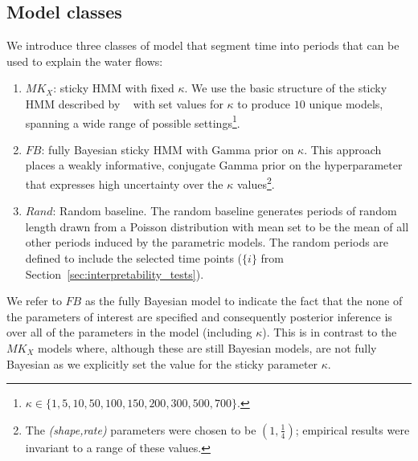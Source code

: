 \documentclass[letterpaper]{article} %
\newcommand{\citename}[1]{\citeauthor{#1}~\shortcite{#1}}
\begin{document}

\subsection{Model classes}
We introduce three classes of model that segment time into periods that can be used to explain the water flows:

\begin{enumerate}
    \item  {${MK_X}$: sticky HMM with fixed $\kappa$.} We use the basic structure of the sticky HMM described by \citename{fox2008hdp} with set values for $\kappa$ to produce $10$ unique models, spanning a wide range of possible settings\footnote{$\kappa \in \{1, 5, 10, 50, 100, 150, 200, 300, 500, 700\}$.}. 
    \item  {${FB}$: fully Bayesian sticky HMM with Gamma prior on $\kappa$.} This  approach places a weakly informative, conjugate Gamma prior on the hyperparameter that expresses high uncertainty over the $\kappa$ values\footnote{The \textit{(shape,rate)} parameters were chosen to be $(1,\frac{1}{4})$; empirical results were invariant to a range of these values.}.
    \item  {${Rand}$: Random baseline.} The random baseline generates periods of random length drawn from a Poisson distribution with mean set to be the mean of all other periods induced by the parametric models. The random periods are defined to include the selected time points ($\{i\}$ from Section~\ref{sec:interpretability_tests}).
\end{enumerate}

\noindent We refer to ${FB}$ as the fully Bayesian model to indicate the fact that the none of the parameters of interest are specified and consequently posterior inference is over all of the parameters in the model (including $\kappa$). This is in contrast to the ${MK_X}$ models where, although these are still Bayesian models, are not fully Bayesian as we explicitly set the value for the sticky parameter $\kappa$.
\end{document}
